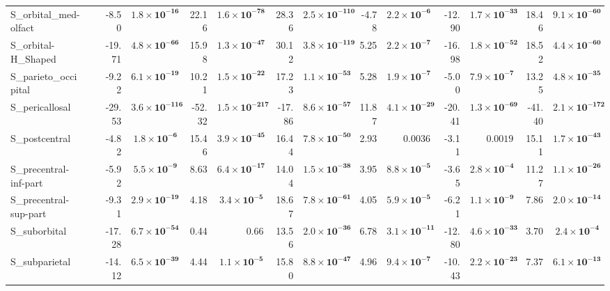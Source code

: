 {\begin{longtable}{llrrrrrrrrrrrr}
S\_orbital\_med-olfact &  & -8.50 & $\mathbf{1.8{\times}10^{-16}}$ & 22.16 & $\mathbf{1.6{\times}10^{-78}}$ & 28.36 & $\mathbf{2.5{\times}10^{-110}}$ & -4.78 & $\mathbf{2.2{\times}10^{-6}}$ & -12.90 & $\mathbf{1.7{\times}10^{-33}}$ & 18.46 & $\mathbf{9.1{\times}10^{-60}}$ \\
S\_orbital-H\_Shaped &  & -19.71 & $\mathbf{4.8{\times}10^{-66}}$ & 15.98 & $\mathbf{1.3{\times}10^{-47}}$ & 30.12 & $\mathbf{3.8{\times}10^{-119}}$ & 5.25 & $\mathbf{2.2{\times}10^{-7}}$ & -16.98 & $\mathbf{1.8{\times}10^{-52}}$ & 18.52 & $\mathbf{4.4{\times}10^{-60}}$ \\
S\_parieto\_occipital &  & -9.22 & $\mathbf{6.1{\times}10^{-19}}$ & 10.21 & $\mathbf{1.5{\times}10^{-22}}$ & 17.23 & $\mathbf{1.1{\times}10^{-53}}$ & 5.28 & $\mathbf{1.9{\times}10^{-7}}$ & -5.00 & $\mathbf{7.9{\times}10^{-7}}$ & 13.25 & $\mathbf{4.8{\times}10^{-35}}$ \\
S\_pericallosal &  & -29.53 & $\mathbf{3.6{\times}10^{-116}}$ & -52.32 & $\mathbf{1.5{\times}10^{-217}}$ & -17.86 & $\mathbf{8.6{\times}10^{-57}}$ & 11.87 & $\mathbf{4.1{\times}10^{-29}}$ & -20.41 & $\mathbf{1.3{\times}10^{-69}}$ & -41.40 & $\mathbf{2.1{\times}10^{-172}}$ \\
S\_postcentral &  & -4.82 & $\mathbf{1.8{\times}10^{-6}}$ & 15.46 & $\mathbf{3.9{\times}10^{-45}}$ & 16.44 & $\mathbf{7.8{\times}10^{-50}}$ & 2.93 & $0.0036$ & -3.11 & $0.0019$ & 15.11 & $\mathbf{1.7{\times}10^{-43}}$ \\
S\_precentral-inf-part &  & -5.92 & $\mathbf{5.5{\times}10^{-9}}$ & 8.63 & $\mathbf{6.4{\times}10^{-17}}$ & 14.04 & $\mathbf{1.5{\times}10^{-38}}$ & 3.95 & $\mathbf{8.8{\times}10^{-5}}$ & -3.65 & $\mathbf{2.8{\times}10^{-4}}$ & 11.27 & $\mathbf{1.1{\times}10^{-26}}$ \\
S\_precentral-sup-part &  & -9.31 & $\mathbf{2.9{\times}10^{-19}}$ & 4.18 & $\mathbf{3.4{\times}10^{-5}}$ & 18.67 & $\mathbf{7.8{\times}10^{-61}}$ & 4.05 & $\mathbf{5.9{\times}10^{-5}}$ & -6.21 & $\mathbf{1.1{\times}10^{-9}}$ & 7.86 & $\mathbf{2.0{\times}10^{-14}}$ \\
S\_suborbital &  & -17.28 & $\mathbf{6.7{\times}10^{-54}}$ & 0.44 & $0.66$ & 13.56 & $\mathbf{2.0{\times}10^{-36}}$ & 6.78 & $\mathbf{3.1{\times}10^{-11}}$ & -12.80 & $\mathbf{4.6{\times}10^{-33}}$ & 3.70 & $\mathbf{2.4{\times}10^{-4}}$ \\
S\_subparietal &  & -14.12 & $\mathbf{6.5{\times}10^{-39}}$ & 4.44 & $\mathbf{1.1{\times}10^{-5}}$ & 15.80 & $\mathbf{8.8{\times}10^{-47}}$ & 4.96 & $\mathbf{9.4{\times}10^{-7}}$ & -10.43 & $\mathbf{2.2{\times}10^{-23}}$ & 7.37 & $\mathbf{6.1{\times}10^{-13}}$ \\

\end{longtable}}

